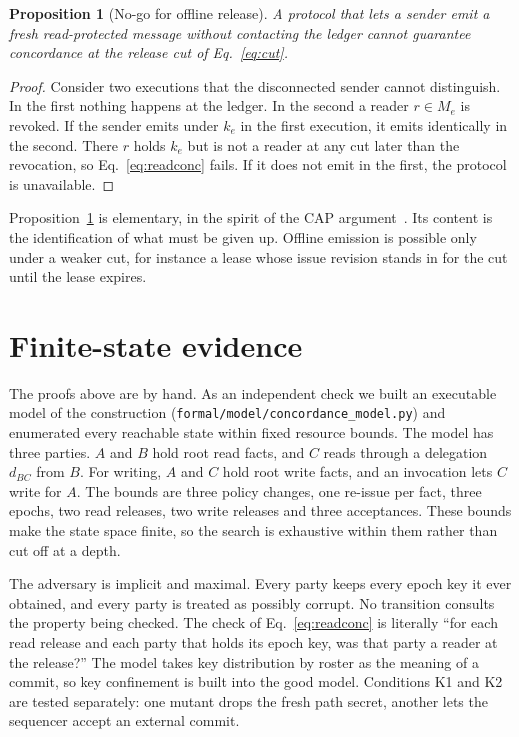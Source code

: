 \documentclass[aps,prx,reprint,superscriptaddress,nofootinbib,floatfix]{revtex4-2}
\newtheorem{proposition}{Proposition}
\theoremstyle{remark}
\newcommand{\roster}{M}
\begin{document}
\begin{proposition}[No-go for offline release]\label{prop:price}
A protocol that lets a sender emit a fresh read-protected message without contacting the ledger cannot guarantee concordance at the release cut of Eq.~\eqref{eq:cut}.
\end{proposition}
\begin{proof}
Consider two executions that the disconnected sender cannot distinguish. In the first nothing happens at the ledger. In the second a reader $r\in\roster_e$ is revoked. If the sender emits under $k_e$ in the first execution, it emits identically in the second. There $r$ holds $k_e$ but is not a reader at any cut later than the revocation, so Eq.~\eqref{eq:readconc} fails. If it does not emit in the first, the protocol is unavailable.
\end{proof}
Proposition~\ref{prop:price} is elementary, in the spirit of the CAP argument~\cite{gilbert-lynch}. Its content is the identification of what must be given up. Offline emission is possible only under a weaker cut, for instance a lease whose issue revision stands in for the cut until the lease expires.

\section{Finite-state evidence}\label{sec:evidence}

The proofs above are by hand. As an independent check we built an executable model of the construction (\texttt{formal/model/concordance\_model.py}) and enumerated every reachable state within fixed resource bounds. The model has three parties. $A$ and $B$ hold root read facts, and $C$ reads through a delegation $d_{BC}$ from $B$. For writing, $A$ and $C$ hold root write facts, and an invocation lets $C$ write for $A$. The bounds are three policy changes, one re-issue per fact, three epochs, two read releases, two write releases and three acceptances. These bounds make the state space finite, so the search is exhaustive within them rather than cut off at a depth.

The adversary is implicit and maximal. Every party keeps every epoch key it ever obtained, and every party is treated as possibly corrupt. No transition consults the property being checked. The check of Eq.~\eqref{eq:readconc} is literally ``for each read release and each party that holds its epoch key, was that party a reader at the release?'' The model takes key distribution by roster as the meaning of a commit, so key confinement is built into the good model. Conditions K1 and K2 are tested separately: one mutant drops the fresh path secret, another lets the sequencer accept an external commit.
\end{document}
